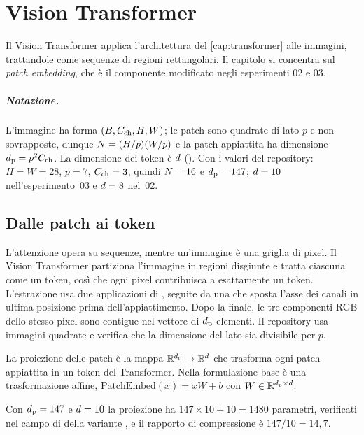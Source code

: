 \chapter{Vision Transformer}
\label{cap:vit}

Il Vision Transformer \parencite{dosovitskiy2020image} applica l'architettura del
\cref{cap:transformer} alle immagini, trattandole come sequenze di regioni
rettangolari. Il capitolo si concentra sul \emph{patch embedding}, che è il
componente modificato negli esperimenti 02 e 03.

\paragraph{Notazione.} L'immagine ha forma $(B, C_{\mathrm{ch}}, H, W)$; le patch
sono quadrate di lato $p$ e non sovrapposte, dunque
$N = (H/p)(W/p)$ e la patch appiattita ha dimensione
$d_{\mathrm{p}} = p^2C_{\mathrm{ch}}$. La dimensione dei token è $d$
(). Con i valori del repository: $H = W = 28$, $p = 7$,
$C_{\mathrm{ch}} = 3$, quindi $N = 16$ e $d_{\mathrm{p}} = 147$; $d = 10$
nell'esperimento~03 e $d = 8$ nel~02.

\section{Dalle patch ai token}

L'attenzione opera su sequenze, mentre un'immagine è una griglia di pixel. Il
Vision Transformer partiziona l'immagine in regioni disgiunte e tratta ciascuna
come un token, così che ogni pixel contribuisca a esattamente un token.
L'estrazione usa due applicazioni di , seguite da una 
che sposta l'asse dei canali in ultima posizione prima dell'appiattimento. Dopo
la  finale, le tre componenti RGB dello stesso pixel sono contigue nel
vettore di $d_{\mathrm{p}}$ elementi. Il repository usa immagini quadrate e verifica che
la dimensione del lato sia divisibile per $p$.

\begin{definizione}
La proiezione delle patch è la mappa $\mathbb{R}^{d_{\mathrm{p}}} \to \mathbb{R}^{d}$ che trasforma
ogni patch appiattita in un token del Transformer. Nella formulazione base è una
trasformazione affine, $\text{PatchEmbed}(x) = xW + b$ con
$W \in \mathbb{R}^{d_{\mathrm{p}} \times d}$.
\end{definizione}

Con $d_{\mathrm{p}} = 147$ e $d = 10$ la proiezione ha $147 \times 10 + 10 =
\num{1480}$ parametri, verificati nel campo  di
 della variante , e il rapporto di compressione è
$147/10 = 14{,}7$.

